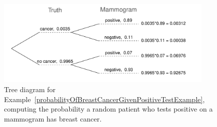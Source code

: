 \begin{doublespace}
\begin{example}
\label{probabilityOfBreastCancerGivenPositiveTestExample}

\begin{figure}[h]
\centering
\includegraphics[width=0.93\textwidth]{ch_probability_oi_biostat/figures/BreastCancerTreeDiagram/BreastCancerTreeDiagram}
\caption{Tree diagram for Example~\ref{probabilityOfBreastCancerGivenPositiveTestExample}, computing the probability a random patient who tests positive on a mammogram has breast cancer.}
\label{BreastCancerTreeDiagram}
\end{figure}


\end{example}
\end{doublespace}
